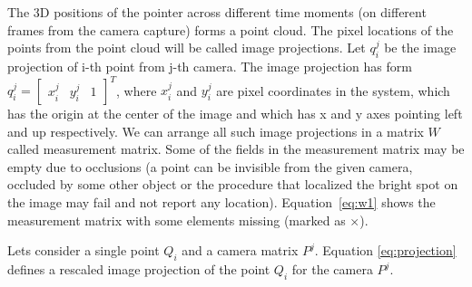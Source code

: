 \documentclass[12pt]{article}
\begin{document}
The 3D positions of the pointer across different time moments (on different frames
from the camera  capture) forms a point cloud. The pixel locations of the points
from the point cloud will be  called image projections. Let $q_i^j$ be the
image projection of i-th point from j-th  camera. The image projection has form
$q_i^j = \begin{bmatrix} x_i^j & y_i^j & 1 \end{bmatrix}^T$, where $x_i^j$ and
$y_i^j$ are  pixel coordinates in the system, which has the origin at the center of
the image and which has x and y axes pointing left and up respectively. We can
arrange all such image projections in a   matrix $W$ called measurement matrix.
Some of the fields in the measurement matrix may be empty due to occlusions (a
point can be invisible from the given camera, occluded by some other object or the
procedure that localized the bright spot on the image may fail and not report
any location). Equation~\ref{eq:w1} shows the measurement matrix with some
elements missing (marked as $\times$).


Lets consider a single point $Q_i$ and a camera matrix $P^j$. Equation
\ref{eq:projection} defines a rescaled image projection of the point $Q_i$ for
the camera $P^j$.
\end{document}
